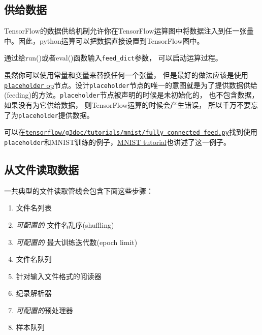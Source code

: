 \subsection{供给数据 }\label{ux4f9bux7ed9ux6570ux636e}

TensorFlow的数据供给机制允许你在TensorFlow运算图中将数据注入到任一张量中。因此，python运算可以把数据直接设置到TensorFlow图中。

通过给run()或者eval()函数输入\texttt{feed\_dict}参数，
可以启动运算过程。

\begin{Shaded}
\begin{Highlighting}[]
 
   \OperatorTok{=} 
  \OperatorTok{=} 
   \OperatorTok{=}\NormalTok{\{}
\end{Highlighting}
\end{Shaded}

虽然你可以使用常量和变量来替换任何一个张量，
但是最好的做法应该是使用\href{tensorflow-zh/SOURCE/api_docs/python/io_ops.md\#placeholder}{\texttt{placeholder}
op}节点。设计\texttt{placeholder}节点的唯一的意图就是为了提供数据供给(feeding)的方法。\texttt{placeholder}节点被声明的时候是未初始化的，
也不包含数据， 如果没有为它供给数据， 则TensorFlow运算的时候会产生错误，
所以千万不要忘了为\texttt{placeholder}提供数据。

可以在\href{https://tensorflow.googlesource.com/tensorflow/+/master/tensorflow/g3doc/tutorials/mnist/fully_connected_feed.py}{\texttt{tensorflow/g3doc/tutorials/mnist/fully\_connected\_feed.py}}找到使用\texttt{placeholder}和MNIST训练的例子，\href{tensorflow-zh/SOURCE/tutorials/mnist/tf/index.md}{MNIST
tutorial}也讲述了这一例子。

\subsection{从文件读取数据
}\label{ux4eceux6587ux4ef6ux8bfbux53d6ux6570ux636e}

一共典型的文件读取管线会包含下面这些步骤：

\begin{enumerate}
\def\labelenumi{\arabic{enumi}.}
\tightlist
\item
  文件名列表
\item
  \emph{可配置的} 文件名乱序(shuffling)
\item
  \emph{可配置的} 最大训练迭代数(epoch limit)
\item
  文件名队列
\item
  针对输入文件格式的阅读器
\item
  纪录解析器
\item
  \emph{可配置的}预处理器
\item
  样本队列
\end{enumerate}

